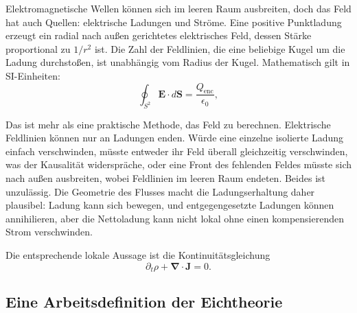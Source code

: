 Elektromagnetische Wellen können sich im leeren Raum ausbreiten, doch das Feld hat auch Quellen: elektrische Ladungen und Ströme. Eine positive Punktladung erzeugt ein radial nach außen gerichtetes elektrisches Feld, dessen Stärke proportional zu \(1/r^2\) ist. Die Zahl der Feldlinien, die eine beliebige Kugel um die Ladung durchstoßen, ist unabhängig vom Radius der Kugel. Mathematisch gilt in SI-Einheiten:
\begin{equation}
\oint_{S^2}\boldsymbol E\cdot d\boldsymbol S
=\frac{Q_{\mathrm{enc}}}{\epsilon_0},
\label{eq:l5-gauss}
\end{equation}

Das ist mehr als eine praktische Methode, das Feld zu berechnen. Elektrische Feldlinien können nur an Ladungen enden. Würde eine einzelne isolierte Ladung einfach verschwinden, müsste entweder ihr Feld überall gleichzeitig verschwinden, was der Kausalität widerspräche, oder eine Front des fehlenden Feldes müsste sich nach außen ausbreiten, wobei Feldlinien im leeren Raum endeten. Beides ist unzulässig. Die Geometrie des Flusses macht die Ladungserhaltung daher plausibel: Ladung kann sich bewegen, und entgegengesetzte Ladungen können annihilieren, aber die Nettoladung kann nicht lokal ohne einen kompensierenden Strom verschwinden.

Die entsprechende lokale Aussage ist die Kontinuitätsgleichung
\begin{equation}
\partial_t\rho+\boldsymbol\nabla\cdot\boldsymbol J=0.
\label{eq:l5-continuity}
\end{equation}

\subsection{Eine Arbeitsdefinition der Eichtheorie}

